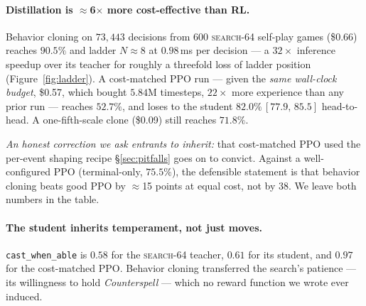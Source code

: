 \documentclass[11pt]{article}
\newcommand{\searchn}[1]{\textsc{search}-#1}
\newcommand{\ci}[2]{\,[#1,\,#2]}
\begin{document}
\paragraph{Distillation is $\approx$6$\times$ more cost-effective than RL.} Behavior cloning on $73{,}443$ decisions from 600 \searchn{64} self-play games (\$0.66) reaches $90.5\%$ and ladder $N\approx8$ at $0.98$\,ms per decision --- a $32\times$ inference speedup over its teacher for roughly a threefold loss of ladder position (Figure~\ref{fig:ladder}). A cost-matched PPO run --- given the \emph{same wall-clock budget}, \$0.57, which bought $5.84$M timesteps, $22\times$ more experience than any prior run --- reaches $52.7\%$, and loses to the student $82.0\%\ci{77.9}{85.5}$ head-to-head. A one-fifth-scale clone (\$0.09) still reaches $71.8\%$.

\emph{An honest correction we ask entrants to inherit:} that cost-matched PPO used the per-event shaping recipe \S\ref{sec:pitfalls} goes on to convict. Against a well-configured PPO (terminal-only, $75.5\%$), the defensible statement is that behavior cloning beats good PPO by $\approx$15 points at equal cost, not by 38. We leave both numbers in the table.

\paragraph{The student inherits temperament, not just moves.} \texttt{cast\_when\_able} is $0.58$ for the \searchn{64} teacher, $0.61$ for its student, and $0.97$ for the cost-matched PPO. Behavior cloning transferred the search's patience --- its willingness to hold \textit{Counterspell} --- which no reward function we wrote ever induced.
\end{document}
